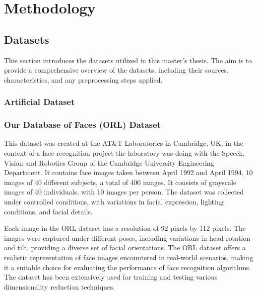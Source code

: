 \chapter{Methodology}






\section{Datasets}
This section introduces the datasets utilized in this master's thesis. The aim is to provide a comprehensive overview of the datasets, including their sources, characteristics, and any preprocessing steps applied.

\subsection{Artificial Dataset}


\subsection{Our Database of Faces (ORL) Dataset}
This dataset was created at the AT\&T Laboratories in Cambridge, UK, in the context of a face recognition project the laboratory was doing with the Speech, Vision and Robotics Group of the Cambridge University Engineering Department. It contains face images taken between April 1992 and April 1994, 10 images of 40 different subjects, a total of 400 images. It consists of grayscale images of 40 individuals, with 10 images per person. The dataset was collected under controlled conditions, with variations in facial expression, lighting conditions, and facial details.

Each image in the ORL dataset has a resolution of 92 pixels by 112 pixels. The images were captured under different poses, including variations in head rotation and tilt, providing a diverse set of facial orientations. The ORL dataset offers a realistic representation of face images encountered in real-world scenarios, making it a suitable choice for evaluating the performance of face recognition algorithms. The dataset has been extensively used for training and testing various dimensionality reduction techniques.


